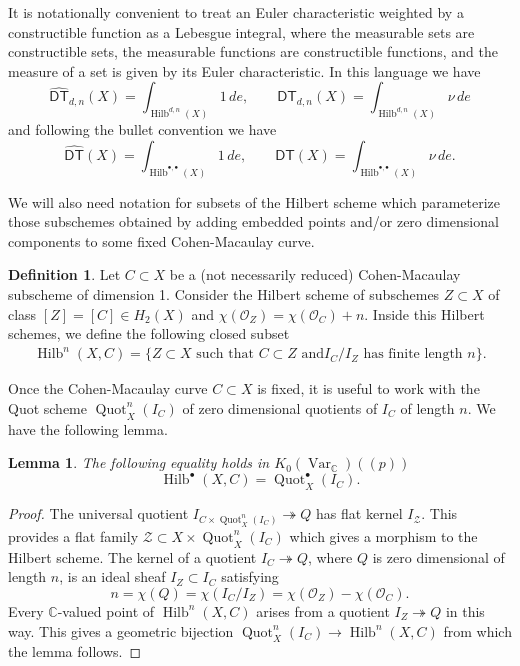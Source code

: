 \documentclass[12pt]{amsart}
\newtheorem{lemma}[theorem]{Lemma}
\theoremstyle{definition}
\newtheorem{definition}[theorem]{Definition}
\newcommand{\CC} {\mathbb{C}}          %
\renewcommand{\O}{\mathcal{O}}
\newcommand{\Hilb}{\operatorname{Hilb}}
\newcommand{\Quot}{\operatorname{Quot}}
\newcommand{\DT}{\mathsf{DT}}
\newcommand{\Var}{\operatorname{Var}}
\newcommand{\DThat}{\widehat{\DT}}
\begin{document}
It is notationally convenient to treat an Euler characteristic
weighted by a constructible function as a Lebesgue integral, where the
measurable sets are constructible sets, the measurable functions are
constructible functions, and the measure of a set is given by its
Euler characteristic. In this language we have
\[
\DThat_{d ,n}(X) =  \int_{\Hilb^{d ,n}(X)} 1\, de, \quad \quad
\DT_{d ,n}(X) = \int_{\Hilb^{d ,n}(X)} \nu \, de
\]
and following the bullet convention we have
\[
\DThat(X) =  \int_{\Hilb^{\bullet ,\bullet }(X)} 1\, de, \quad \quad
\DT(X) = \int_{\Hilb^{\bullet ,\bullet }(X)} \nu \, de.
\]

We will also need notation for subsets of the Hilbert scheme which
parameterize those subschemes obtained by adding embedded points
and/or zero dimensional components to
some fixed Cohen-Macaulay curve.

\begin{definition}\label{defn: Hilb(U,C)}
Let $C\subset X$ be a (not necessarily reduced)
Cohen-Macaulay subscheme of dimension 1. Consider the Hilbert scheme 
of subschemes $Z \subset X$ of class $[Z] = [C] \in H_2(X)$ and 
$\chi(\O_Z) = \chi(\O_C)+n$. Inside this Hilbert schemes, we define the 
following closed subset
\begin{align*}
\Hilb^{n}(X,C) = \{Z\subset X \text{ such that }C\subset Z\text{ and
$I_{C}/I_{Z}$ has finite length $n$} \}.
\end{align*}
\end{definition}

Once the Cohen-Macaulay curve $C \subset X$ is fixed, it is useful to work with the Quot scheme $\Quot_X^n(I_C)$ of zero dimensional quotients of $I_C$ of length $n$. We have the following lemma.
\begin{lemma} \label{HilbtoQuot}
The following equality holds in $K_0(\Var_{\CC})(\!(p)\!)$
\[
\Hilb^\bullet(X,C) = \Quot^\bullet_X(I_C).
\]
\end{lemma}
\begin{proof}
The universal quotient $I_{C \times \Quot^n_X(I_C)} \twoheadrightarrow Q$ has flat kernel $I_{\mathcal{Z}}$. This provides a flat family $\mathcal{Z} \subset X \times  \Quot^n_X(I_C)$ which gives a morphism to the Hilbert scheme. The kernel of a quotient $I_C \twoheadrightarrow Q$, where $Q$ is zero dimensional of length $n$, is an ideal sheaf $I_Z \subset I_C$ satisfying
$$
n = \chi(Q) = \chi(I_C / I_Z) = \chi(\O_Z) - \chi(\O_C).
$$
Every $\CC$-valued point of $\Hilb^n(X,C)$ arises from a quotient $I_Z \twoheadrightarrow Q$ in this way. This gives a geometric bijection $\Quot^n_X(I_C) \rightarrow \Hilb^n(X,C)$ from which the lemma follows.
\end{proof}
\end{document}
